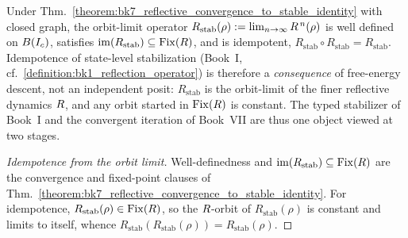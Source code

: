 \begin{proposition}
\label{proposition:bk7_stabilization_as_orbit_limit}
Under Thm.~\ref{theorem:bk7_reflective_convergence_to_stable_identity} with closed graph, the orbit-limit operator $R_{\mathrm{stab}}(\rho) := \lim_{n\to\infty}R^{\,n}(\rho)$ is well defined on $B(I_c)$, satisfies $\operatorname{im}(R_{\mathrm{stab}}) \subseteq \operatorname{Fix}(R)$, and is idempotent, $R_{\mathrm{stab}} \circ R_{\mathrm{stab}} = R_{\mathrm{stab}}$. Idempotence of state-level stabilization (Book~I, cf.~\ref{definition:bk1_reflection_operator}) is therefore a \emph{consequence} of free-energy descent, not an independent posit: $R_{\mathrm{stab}}$ is the orbit-limit of the finer reflective dynamics $R$, and any orbit started in $\operatorname{Fix}(R)$ is constant. The typed stabilizer of Book~I and the convergent iteration of Book~VII are thus one object viewed at two stages.
\end{proposition}

\begin{proof}[Idempotence from the orbit limit]
\label{proof:bk7_stabilization_as_orbit_limit}
\leavevmode
Well-definedness and $\operatorname{im}(R_{\mathrm{stab}}) \subseteq \operatorname{Fix}(R)$ are the convergence and fixed-point clauses of Thm.~\ref{theorem:bk7_reflective_convergence_to_stable_identity}. For idempotence, $R_{\mathrm{stab}}(\rho) \in \operatorname{Fix}(R)$, so the $R$-orbit of $R_{\mathrm{stab}}(\rho)$ is constant and limits to itself, whence $R_{\mathrm{stab}}(R_{\mathrm{stab}}(\rho)) = R_{\mathrm{stab}}(\rho)$.
\end{proof}

